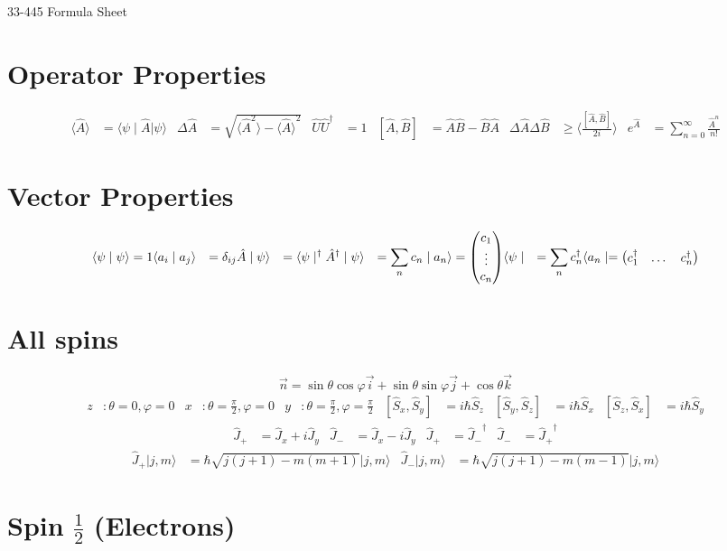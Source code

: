 \documentclass{article}
\newcommand{\mysection}[1]{\vspace{-2em}
\section*{#1}
\vspace{-2em}}
\newcommand{\bra}[1]{\ensuremath{\langle#1\mid}}
\newcommand{\ket}[1]{\ensuremath{\mid#1\rangle}}
\newcommand{\braket}[2]{\ensuremath{\langle#1\mid#2\rangle}}
\newcommand{\expect}[1]{\ensuremath{\langle#1\rangle}}
\newcommand{\op}[1]{\ensuremath{\hat#1}}
\newcommand{\opt}[1]{\tp{\op{#1}}}
\newcommand{\tp}[1]{\ensuremath{#1^\dagger}}
\newcommand{\mat}[1]{\begin{pmatrix}\ensuremath{#1}\end{pmatrix}}
\begin{document}
	\begin{center}
		{\LARGE{33-445 Formula Sheet}}
	\end{center}
	\mysection{Operator Properties}
	\begin{align*}
		\expect{\op{A}}&=\bra{\psi}\op{A}\ket{\psi} &
		\Delta\op{A}&=\sqrt{\expect{\op{A}^2}-\expect{\op{A}}^2} &
		\op{U}\opt{U}&=1 & 
		[\op{A},\op{B}]&=\op{A}\op{B}-\op{B}\op{A} &
		\Delta\op{A}\Delta\op{B}&\ge\expect{\frac{[\op{A},\op{B}]}{2i}} &
		e^{\op{A}}&=\sum\limits_{n=0}^\infty\frac{\op{A}^n}{n!}
	\end{align*}
	\mysection{Vector Properties}
	\begin{align*}
		\braket{\psi}{\psi}=1 &
		\braket{a_i}{a_j}&=\delta_{ij} &
		\op{A}\ket{\psi}&=\tp{\bra{\psi}}\opt{A} &
		\ket{\psi}&=\sum\limits_nc_n\ket{a_n}=\mat{c_1\\\vdots\\c_n} &
		\bra{\psi}&=\sum\limits_n\tp{c_n}\bra{a_n}=\mat{\tp{c_1}&\dots&\tp{c_n}}
	\end{align*}
	\mysection{All spins}
	\[\vec{n}=\sin\theta\cos\varphi\vec{i}+\sin\theta\sin\varphi\vec{j}+
		\cos\theta\vec{k}\]
	\begin{align*}
		z&:\theta=0,\varphi=0 & 
		x&:\theta=\frac{\pi}{2},\varphi=0 &
		y&:\theta=\frac{\pi}{2},\varphi=\frac{\pi}{2} &
		[\op{S_x},\op{S_y}]&=i\hbar\op{S_z} &
		[\op{S_y},\op{S_z}]&=i\hbar\op{S_x} &
		[\op{S_z},\op{S_x}]&=i\hbar\op{S_y}
	\end{align*}
	\vspace{-2em}
	\begin{align*}
		\op{J_+}&=\op{J_x}+i\op{J_y} &
		\op{J_-}&=\op{J_x}-i\op{J_y} &
		\op{J_+}&=\opt{J_-} &
		\op{J_-}&=\opt{J_+}
	\end{align*}
	\vspace{-2em}
	\begin{align*}
		\op{J_+}\ket{j,m}&=\hbar\sqrt{j(j+1)-m(m+1)}\ket{j,m} &
		\op{J_-}\ket{j,m}&=\hbar\sqrt{j(j+1)-m(m-1)}\ket{j,m}
	\end{align*}
	\mysection{Spin $\frac{1}{2}$ (Electrons)}
\end{document}
